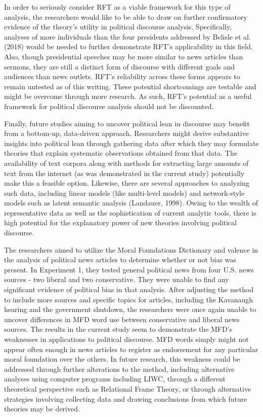 \documentclass[english,,man]{apa6}
\begin{document}
In order to seriously consider RFT as a viable framework for this type of analysis, the researchers would like to be able to draw on further confirmatory evidence of the theory's utility in political discourse analysis. Specifically, analyses of more individuals than the four presidents addressed by Belisle et al. (2018) would be needed to further demonstrate RFT's applicability in this field. Also, though presidential speeches may be more similar to news articles than sermons, they are still a distinct form of discourse with different goals and audiences than news outlets. RFT's reliability across these forms appears to remain untested as of this writing. These potential shortcomings are testable and might be overcome through more research. As such, RFT's potential as a useful framework for political discourse analysis should not be discounted.

Finally, future studies aiming to uncover political lean in discourse may benefit from a bottom-up, data-driven approach. Researchers might derive substantive insights into political lean through gathering data after which they may formulate theories that explain systematic observations obtained from that data. The availability of text corpora along with methods for extracting large amounts of text from the internet (as was demonstrated in the current study) potentially make this a feasible option. Likewise, there are several approaches to analyzing such data, including linear models (like multi-level models) and network-style models such as latent semantic analysis (Landauer, 1998). Owing to the wealth of representative data as well as the sophistication of current analytic tools, there is high potential for the explanatory power of new theories involving political discourse.

The researchers aimed to utilize the Moral Foundations Dictionary and valence in the analysis of political news articles to determine whether or not bias was present. In Experiment 1, they tested general political news from four U.S. news sources - two liberal and two conservative. They were unable to find any significant evidence of political bias in that analysis. After adjusting the method to include more sources and specific topics for articles, including the Kavanaugh hearing and the government shutdown, the researchers were once again unable to uncover differences in MFD word use between conservative and liberal news sources. The results in the current study seem to demonstrate the MFD's weaknesses in applications to political discourse. MFD words simply might not appear often enough in news articles to register as endorsement for any particular moral foundation over the others. In future research, this weakness could be addressed through further alterations to the method, including alternative analyses using computer programs including LIWC, through a different theoretical perspective such as Relational Frame Theory, or through alternative strategies involving collecting data and drawing conclusions from which future theories may be derived.
\end{document}
